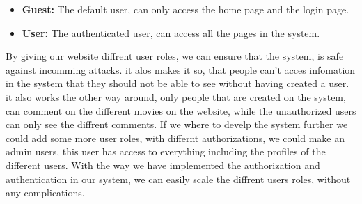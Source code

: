 \begin{itemize}
    \item \textbf{Guest:} The default user, can only access the home page and the login page.
    \item \textbf{User:} The authenticated user, can access all the pages in the system.
\end{itemize}

By giving our website diffrent user roles, we can ensure that the system, is safe against incomming attacks. 
it alos makes it so, that people can't acces infomation in the system that they should not be able to see without having created a user. \newline
it also works the other way around, only people that are created on the system, can comment on the different movies on the website, while the unauthorized users can only see the diffrent comments. 
If we where to develp the system further we could add some more user roles, with differnt authorizations, we could make an admin users, this user has access to everything including the profiles of the different users. 
With the way we have implemented the authorization and authentication in our system, we can easily scale the diffrent users roles, without any complications. \newline

